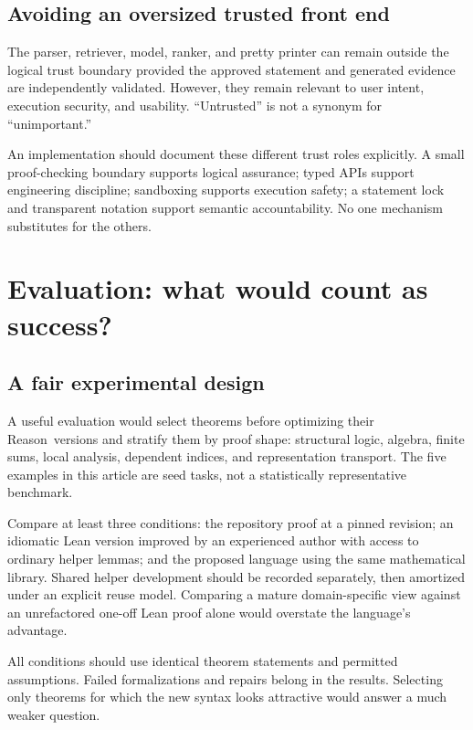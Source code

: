 \documentclass[11pt,a4paper]{article}
\newcommand{\Reason}{\textsf{Reason}}
\theoremstyle{remark}
\begin{document}
\subsection{Avoiding an oversized trusted front end}

The parser, retriever, model, ranker, and pretty printer can remain outside the logical trust boundary provided the approved statement and generated evidence are independently validated. However, they remain relevant to user intent, execution security, and usability. ``Untrusted'' is not a synonym for ``unimportant.''

An implementation should document these different trust roles explicitly. A small proof-checking boundary supports logical assurance; typed APIs support engineering discipline; sandboxing supports execution safety; a statement lock and transparent notation support semantic accountability. No one mechanism substitutes for the others.

\section{Evaluation: what would count as success?}\label{sec:evaluation}

\subsection{A fair experimental design}

A useful evaluation would select theorems before optimizing their \Reason\ versions and stratify them by proof shape: structural logic, algebra, finite sums, local analysis, dependent indices, and representation transport. The five examples in this article are seed tasks, not a statistically representative benchmark.

Compare at least three conditions: the repository proof at a pinned revision; an idiomatic Lean version improved by an experienced author with access to ordinary helper lemmas; and the proposed language using the same mathematical library. Shared helper development should be recorded separately, then amortized under an explicit reuse model. Comparing a mature domain-specific view against an unrefactored one-off Lean proof alone would overstate the language's advantage.

All conditions should use identical theorem statements and permitted assumptions. Failed formalizations and repairs belong in the results. Selecting only theorems for which the new syntax looks attractive would answer a much weaker question.
\end{document}
